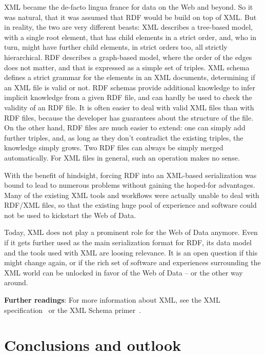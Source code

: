 \documentclass{IOS-Book-Article}
\begin{document}
XML became the de-facto lingua france for data on the Web and beyond.
So it was natural, that it was assumed that RDF would be build on top of XML.
But in reality, the two are very different beasts:
XML describes a tree-based model, with a single root element, that has child elements in a strict order, and, who in turn, might have further child elements, in strict orders too, all strictly hierarchical.
RDF describes a graph-based model, where the order of the edges does not matter, and that is expressed as a simple set of triples.
XML schema defines a strict grammar for the elements in an XML documents, determining if an XML file is valid or not.
RDF schemas provide additional knowledge to infer implicit knowledge from a given RDF file, and can hardly be used to check the validity of an RDF file.
It is often easier to deal with valid XML files than with RDF files, because the developer has guarantees about the structure of the file.
On the other hand, RDF files are much easier to extend: one can simply add further triples, and, as long as they don't contradict the existing triples, the knowledge simply grows.
Two RDF files can always be simply merged automatically. For XML files in general, such an operation makes no sense.

With the benefit of hindsight, forcing RDF into an XML-based serialization was bound to lead to numerous problems without gaining the hoped-for advantages.
Many of the existing XML tools and workflows were actually unable to deal with RDF/XML files, so that the existing huge pool of experience and software could not be used to kickstart the Web of Data.

Today, XML does not play a prominent role for the Web of Data anymore.
Even if it gets further used as the main serialization format for RDF, its data model and the tools used with XML are loosing relevance.
It is an open question if this might change again, or if the rich set of software and experiences surrounding the XML world can be unlocked in favor of the Web of Data -- or the other way around.

\medskip

\textbf{Further readings}:
For more information about XML, see the XML specification~\cite{xml} or the XML Schema primer~\cite{xml-primer}.

\section{Conclusions and outlook}
\label{conclusions}
\end{document}
